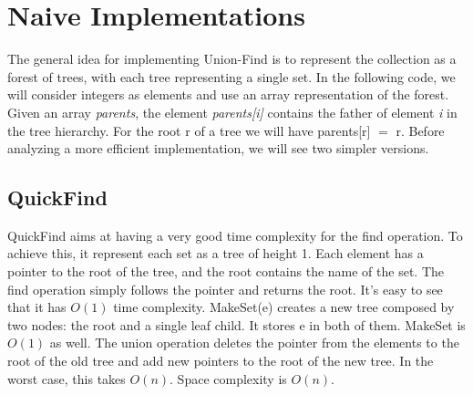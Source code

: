 \documentclass{article}
\begin{document}
\section{Naive Implementations}
The general idea for implementing Union-Find is to represent the collection as a forest of trees, with each tree representing a single set. 
In the following code, we will  consider integers as elements and use an array representation of the forest.
Given an array \emph{parents}, the element \emph{parents[i]} contains the father of element \emph{i} in the tree hierarchy. For the root
r of a tree we will have parents[r] $=$ r. Before analyzing a more efficient implementation, we will see two simpler versions.

\subsection{QuickFind} \label{QF}
QuickFind aims at having a very good time complexity for the find operation. To achieve this, it represent each set as a tree of height 1. Each element
has a pointer to the root of the tree,  and the root contains the name of the set. The find operation simply follows the pointer and returns the root. It's easy to see that it has $O(1)$ time complexity. MakeSet(e) creates a new tree composed by two nodes: the root and a single leaf child. It stores e in both of them. MakeSet is $O(1)$ as well. The union operation deletes the pointer from the elements to the root of the old tree
and add new pointers to the root of the new tree. In the worst case, this takes $O(n)$. Space complexity is $O(n)$. 
\end{document}
